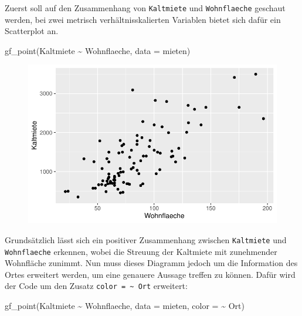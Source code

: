 \documentclass[
  a4paper,
  DIV=11]{scrartcl}
\newenvironment{Shaded}{\begin{snugshade}}{\end{snugshade}}
\newcommand{\AttributeTok}[1]{\textcolor[rgb]{0.40,0.45,0.13}{#1}}
\newcommand{\FunctionTok}[1]{\textcolor[rgb]{0.28,0.35,0.67}{#1}}
\newcommand{\NormalTok}[1]{\textcolor[rgb]{0.00,0.23,0.31}{#1}}
\newcommand{\SpecialCharTok}[1]{\textcolor[rgb]{0.37,0.37,0.37}{#1}}
\begin{document}
Zuerst soll auf den Zusammenhang von \texttt{Kaltmiete} und
\texttt{Wohnflaeche} geschaut werden, bei zwei metrisch
verhältnisskalierten Variablen bietet sich dafür ein Scatterplot an.

\begin{Shaded}
\begin{Highlighting}[]
\FunctionTok{gf\_point}\NormalTok{(Kaltmiete }\SpecialCharTok{\textasciitilde{}}\NormalTok{ Wohnflaeche, }\AttributeTok{data =}\NormalTok{ mieten)}
\end{Highlighting}
\end{Shaded}

\begin{figure}[H]

{\centering \includegraphics{Mietmodellierung_files/figure-pdf/unnamed-chunk-6-1.pdf}

}

\end{figure}

Grundsätzlich lässt sich ein positiver Zusammenhang zwischen
\texttt{Kaltmiete} und \texttt{Wohnflaeche} erkennen, wobei die Streuung
der Kaltmiete mit zunehmender Wohnfläche zunimmt. Nun muss dieses
Diagramm jedoch um die Information des Ortes erweitert werden, um eine
genauere Aussage treffen zu können. Dafür wird der Code um den Zusatz
\texttt{color\ =\ \textasciitilde{}\ Ort} erweitert:

\begin{Shaded}
\begin{Highlighting}[]
\FunctionTok{gf\_point}\NormalTok{(Kaltmiete }\SpecialCharTok{\textasciitilde{}}\NormalTok{ Wohnflaeche, }\AttributeTok{data =}\NormalTok{ mieten, }\AttributeTok{color =} \SpecialCharTok{\textasciitilde{}}\NormalTok{ Ort)}
\end{Highlighting}
\end{Shaded}
\end{document}
